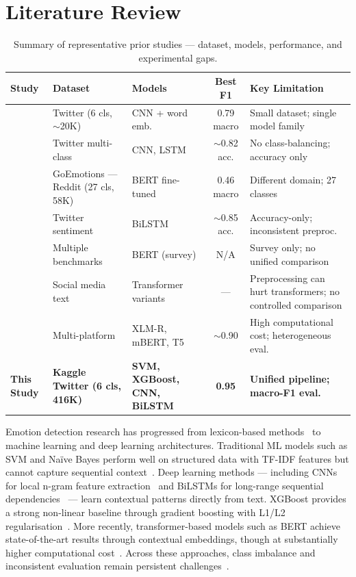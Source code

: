 \section{Literature Review}
\label{sec:literature}

\begin{table}[!t]
\centering
\caption{Summary of representative prior studies --- dataset, models, performance, and experimental gaps.}
\label{tab:prior_work}
\footnotesize
\setlength{\tabcolsep}{4pt}
\begin{tabular}{@{}p{3.2cm}p{3.2cm}p{2.8cm}cp{4.2cm}@{}}
\toprule
\textbf{Study} & \textbf{Dataset} & \textbf{Models} & \textbf{Best F1} & \textbf{Key Limitation} \\
\midrule
\citet{saravia2018carer} & Twitter (6 cls, $\sim$20K) & CNN + word emb. & 0.79 macro & Small dataset; single model family \\
\citet{hasan2019emotion} & Twitter multi-class & CNN, LSTM & $\sim$0.82 acc. & No class-balancing; accuracy only \\
\citet{demszky2020goemotions} & GoEmotions --- Reddit (27 cls, 58K) & BERT fine-tuned & 0.46 macro & Different domain; 27 classes \\
\citet{sun2023bidirectional} & Twitter sentiment & BiLSTM & $\sim$0.85 acc. & Accuracy-only; inconsistent preproc. \\
\citet{acheampong2021transformer} & Multiple benchmarks & BERT (survey) & N/A & Survey only; no unified comparison \\
\citet{rezapour2024emotion} & Social media text & Transformer variants & --- & Preprocessing can hurt transformers; no controlled comparison \\
\citet{almalki2025sentiment} & Multi-platform & XLM-R, mBERT, T5 & $\sim$0.90 & High computational cost; heterogeneous eval. \\
\midrule
\textbf{This Study} & \textbf{Kaggle Twitter (6 cls, 416K)} & \textbf{SVM, XGBoost, CNN, BiLSTM} & \textbf{0.95} & \textbf{Unified pipeline; macro-F1 eval.} \\
\bottomrule
\end{tabular}
\end{table}

Emotion detection research has progressed from lexicon-based methods~\citep{mohammad2013crowdsourcing, strapparava2008learning} to machine learning and deep learning architectures. Traditional ML models such as SVM and Na\"ive Bayes perform well on structured data with TF-IDF features but cannot capture sequential context~\citep{dzikovska2012using, wang2018emotion}. Deep learning methods --- including CNNs for local n-gram feature extraction~\citep{hasan2019emotion} and BiLSTMs for long-range sequential dependencies~\citep{sun2023bidirectional} --- learn contextual patterns directly from text. XGBoost provides a strong non-linear baseline through gradient boosting with L1/L2 regularisation~\citep{chen2016xgboost}. More recently, transformer-based models such as BERT achieve state-of-the-art results through contextual embeddings, though at substantially higher computational cost~\citep{acheampong2021transformer, devlin2019bert}. Across these approaches, class imbalance and inconsistent evaluation remain persistent challenges~\citep{nandwani2021review}.

